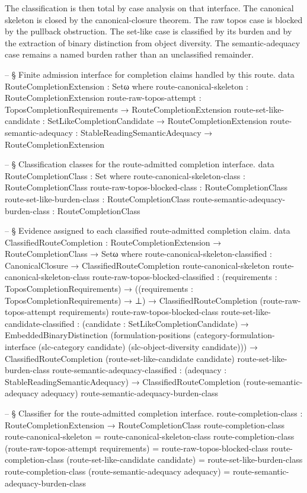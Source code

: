 \documentclass[11pt]{article}
\begin{document}
The classification is then total by case analysis on that interface.
The canonical skeleton is closed by the canonical-closure theorem.  The
raw topos case is blocked by the pullback obstruction.  The set-like case
is classified by its burden and by the extraction of binary distinction
from object diversity.  The semantic-adequacy case remains a named burden
rather than an unclassified remainder.

\begin{code}
-- § Finite admission interface for completion claims handled by this route.
data RouteCompletionExtension : Setω where
  route-canonical-skeleton : RouteCompletionExtension
  route-raw-topos-attempt  :
    ToposCompletionRequirements → RouteCompletionExtension
  route-set-like-candidate :
    SetLikeCompletionCandidate → RouteCompletionExtension
  route-semantic-adequacy  :
    StableReadingSemanticAdequacy → RouteCompletionExtension

-- § Classification classes for the route-admitted completion interface.
data RouteCompletionClass : Set where
  route-canonical-skeleton-class      : RouteCompletionClass
  route-raw-topos-blocked-class       : RouteCompletionClass
  route-set-like-burden-class         : RouteCompletionClass
  route-semantic-adequacy-burden-class : RouteCompletionClass

-- § Evidence assigned to each classified route-admitted completion claim.
data ClassifiedRouteCompletion :
  RouteCompletionExtension → RouteCompletionClass → Setω where
  route-canonical-skeleton-classified :
    CanonicalClosure →
    ClassifiedRouteCompletion
      route-canonical-skeleton
      route-canonical-skeleton-class
  route-raw-topos-blocked-classified :
    (requirements : ToposCompletionRequirements) →
    ((requirements : ToposCompletionRequirements) → ⊥) →
    ClassifiedRouteCompletion
      (route-raw-topos-attempt requirements)
      route-raw-topos-blocked-class
  route-set-like-candidate-classified :
    (candidate : SetLikeCompletionCandidate) →
    EmbeddedBinaryDistinction
      (formulation-positions
        (category-formulation-interface
          (slc-category candidate)
          (slc-object-diversity candidate))) →
    ClassifiedRouteCompletion
      (route-set-like-candidate candidate)
      route-set-like-burden-class
  route-semantic-adequacy-classified :
    (adequacy : StableReadingSemanticAdequacy) →
    ClassifiedRouteCompletion
      (route-semantic-adequacy adequacy)
      route-semantic-adequacy-burden-class

-- § Classifier for the route-admitted completion interface.
route-completion-class : RouteCompletionExtension → RouteCompletionClass
route-completion-class route-canonical-skeleton =
  route-canonical-skeleton-class
route-completion-class (route-raw-topos-attempt requirements) =
  route-raw-topos-blocked-class
route-completion-class (route-set-like-candidate candidate) =
  route-set-like-burden-class
route-completion-class (route-semantic-adequacy adequacy) =
  route-semantic-adequacy-burden-class


\end{code}
\end{document}
